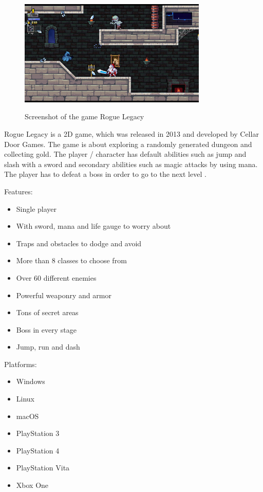 \documentclass[12p]{article}
\begin{document}
\begin{figure}[ht]
  \center
  \includegraphics[width=0.8\textwidth]{StateOfTheArtScreenshots/rogue_legacy}
  \label{sec:StateOfTheArt_Screenshots_RogueLegacy}
  \caption{Screenshot of the game Rogue Legacy \cite{RogueLegacyScreenshot}}
\end{figure}

Rogue Legacy is a 2D game, which was released in 2013 and developed by Cellar Door Games. The game is about exploring a randomly generated dungeon and collecting gold. The player  / character has default abilities such as jump and slash with a sword and secondary abilities such as magic attacks by using mana. The player has to defeat a boss in order to go to the next level \cite{RogueLegacyReview}.

Features: \cite{RogueLegacySteam}

\begin{itemize}
  \item Single player
  \item With sword, mana and life gauge to worry about
  \item Traps and obstacles to dodge and avoid
  \item More than 8 classes to choose from
  \item Over 60 different enemies
  \item Powerful weaponry and armor
  \item Tons of secret areas
  \item Boss in every stage
  \item Jump, run and dash
\end{itemize}

\newpage

Platforms: \cite{RogueLegacyWiki}

\begin{itemize}
    \item Windows
    \item Linux
    \item macOS
    \item PlayStation 3
    \item PlayStation 4
    \item PlayStation Vita
    \item Xbox One
\end{itemize}
\end{document}
